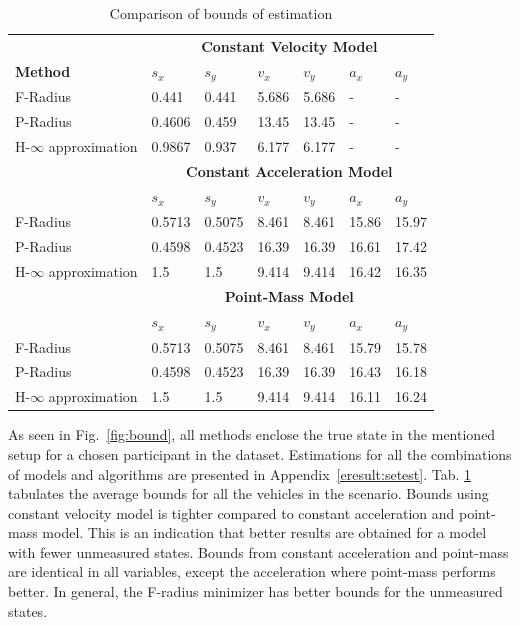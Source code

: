\begin{table}[htbp]
\caption{Comparison of bounds of estimation\\}
	\centering
	\renewcommand{\arraystretch}{1.1}
	\small	
	\begin{tabular}{l l l l l l l}
		\toprule 
		& \multicolumn{6}{c}{\textbf{Constant Velocity Model}}\\
		\textbf{Method} & \textbf{$s_x$} & \textbf{$s_y$} & \textbf{$v_x$} & \textbf{$v_y$} & \textbf{$a_x$} & \textbf{$a_y$}\\ \midrule
		F-Radius & 0.441 & 0.441 & 5.686 & 5.686 & - & -\\
		P-Radius & 0.4606 & 0.459 & 13.45 & 13.45 & - &	-\\
		H-$\infty$ approximation & 0.9867 &	0.937 &	6.177 & 6.177 & - &-\\
		\toprule 
		& \multicolumn{6}{c}{\textbf{Constant Acceleration Model}}\\
		 & \textbf{$s_x$} & \textbf{$s_y$} & \textbf{$v_x$} & \textbf{$v_y$} & \textbf{$a_x$} & \textbf{$a_y$}\\ \midrule
		F-Radius & 0.5713 &	0.5075 &	8.461	& 8.461 &	15.86 &	15.97\\
		P-Radius & 0.4598 &	0.4523 &	16.39 &	16.39 &	16.61 &	17.42\\
		H-$\infty$ approximation & 1.5 & 1.5 & 9.414 &	9.414 &	16.42 &	16.35\\
		\toprule 
		& \multicolumn{6}{c}{\textbf{Point-Mass Model}}\\
		 & \textbf{$s_x$} & \textbf{$s_y$} & \textbf{$v_x$} & \textbf{$v_y$} & \textbf{$a_x$} & \textbf{$a_y$}\\ \midrule
		F-Radius & 0.5713 &	0.5075 &	8.461	& 8.461 &	15.79 &	15.78\\
		P-Radius & 0.4598 &	0.4523 &	16.39 &	16.39 &	16.43 &	16.18\\
		H-$\infty$ approximation & 1.5 & 1.5 & 9.414 &	9.414 &	16.11 &	16.24\\
		\bottomrule
	\end{tabular}
	\label{tab:bound}
\end{table}
As seen in Fig.~\ref{fig:bound}, all methods enclose the true state in the mentioned setup for a chosen participant in the dataset. Estimations for all the combinations of models and algorithms are presented in Appendix~\ref{eresult:setest}. 
Tab. \ref{tab:bound} tabulates the average bounds for all the vehicles in the scenario. Bounds using constant velocity model is tighter compared to constant acceleration and point-mass model. This is an indication that better results are obtained for a model with fewer unmeasured states. Bounds from constant acceleration and point-mass are identical in all variables, except the acceleration where point-mass performs better. In general, the F-radius minimizer has better bounds for the unmeasured states. 


